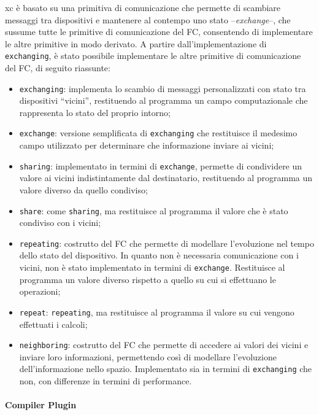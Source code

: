 \documentclass[13pt, a4paper]{article}
\begin{document}
\ac{xc} è basato su una primitiva di comunicazione che permette di scambiare messaggi tra dispositivi e mantenere al contempo uno stato --\emph{exchange}--,
che sussume tutte le primitive di comunicazione del \ac{FC},
consentendo di implementare le altre primitive in modo derivato.
%
A partire dall'implementazione di \texttt{exchanging}, è stato possibile implementare le altre primitive di comunicazione del \ac{FC},
di seguito riassunte:
\begin{itemize}
    \item \texttt{exchanging}: implementa lo scambio di messaggi personalizzati con stato tra dispositivi ``vicini'',
    restituendo al programma un campo computazionale che rappresenta lo stato del proprio intorno;
    \item \texttt{exchange}: versione semplificata di \texttt{exchanging} che restituisce il medesimo campo utilizzato
    per determinare che informazione inviare ai vicini;
    \item \texttt{sharing}: implementato in termini di \texttt{exchange}, permette di condividere un valore ai vicini indistintamente
    dal destinatario, restituendo al programma un valore diverso da quello condiviso;
    \item \texttt{share}: come \texttt{sharing}, ma restituisce al programma il valore che è stato condiviso con i vicini;
    \item \texttt{repeating}: costrutto del \ac{FC} che permette di modellare l'evoluzione nel tempo dello stato del dispositivo.
    In quanto non è necessaria comunicazione con i vicini, non è stato implementato in termini di \texttt{exchange}.
    Restituisce al programma un valore diverso rispetto a quello su cui si effettuano le operazioni;
    \item \texttt{repeat}: \texttt{repeating}, ma restituisce al programma il valore su cui vengono effettuati i calcoli;
    \item \texttt{neighboring}: costrutto del \ac{FC} che permette di accedere ai valori dei vicini e inviare loro informazioni,
    permettendo così di modellare l'evoluzione dell'informazione nello spazio.
    Implementato sia in termini di \texttt{exchanging} che non, con differenze in termini di performance.
\end{itemize}

\paragraph{Compiler Plugin}
\end{document}
